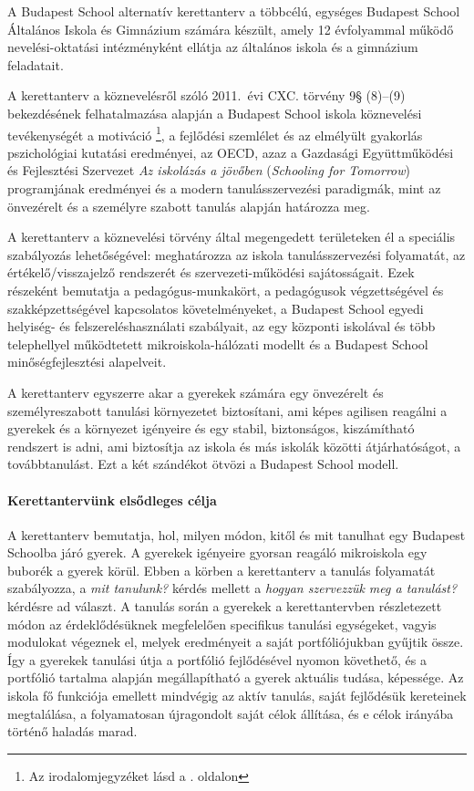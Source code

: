 A Budapest School alternatív kerettanterv a többcélú, egységes	Budapest School Általános Iskola és Gimnázium számára készült, amely 12 évfolyammal működő nevelési-oktatási intézményként ellátja az általános iskola és a gimnázium feladatait.

A kerettanterv a köznevelésről szóló 2011.~évi CXC. törvény 9§ (8)--(9) bekezdésének felhatalmazása alapján a Budapest School iskola köznevelési tevékenységét a motiváció \citep{pink2011drive}\footnote{Az irodalomjegyzéket lásd a \pageref{sec:bibliographyk}. oldalon}, a fejlődési szemlélet \citep{growthmindset} és az elmélyült gyakorlás \citep{ericsson2016peak} pszichológiai kutatási eredményei, az  OECD, azaz a Gazdasági Együttműködési és Fejlesztési Szervezet \emph{Az iskolázás a jövőben}  (\emph{Schooling for Tomorrow}) programjának eredményei \citep{2006schooling} és a modern tanulásszervezési paradigmák, mint az önvezérelt \citep{mitra2012beyond} és a személyre szabott \citep{khan2012one} tanulás alapján határozza meg.

A kerettanterv a köznevelési törvény által megengedett területeken él a speciális szabályozás lehetőségével: meghatározza az iskola tanulásszervezési folyamatát, az értékelő/visszajelző rendszerét és szervezeti-működési sajátosságait. Ezek részeként bemutatja a pedagógus-munkakört, a pedagógusok végzettségével és szakképzettségével kapcsolatos követelményeket, a Budapest School	egyedi helyiség- és felszereléshasználati szabályait, az egy központi iskolával és több telephellyel működtetett mikroiskola-hálózati modellt és a Budapest School minőségfejlesztési alapelveit.

A kerettanterv egyszerre akar a gyerekek számára egy önvezérelt és személyreszabott tanulási környezetet biztosítani, ami képes agilisen reagálni a gyerekek és a környezet igényeire és egy stabil, biztonságos, kiszámítható rendszert is adni, ami biztosítja az iskola és más iskolák közötti átjárhatóságot, a továbbtanulást. Ezt a két szándékot ötvözi a Budapest School modell.

\clearpage


\paragraph{Kerettantervünk elsődleges célja} A kerettanterv bemutatja,
hol, milyen\linebreak
módon, kitől és mit tanulhat egy Budapest Schoolba járó gyerek.
A gyerekek igényeire gyorsan reagáló mikroiskola egy buborék a gyerek körül. Ebben a körben a kerettanterv a tanulás folyamatát szabályozza, a \emph{mit tanulunk?} kérdés mellett a \emph{hogyan szervezzük meg a tanulást?} kérdésre ad választ. A tanulás során a gyerekek a kerettantervben részletezett módon az érdeklődésüknek megfelelően specifikus tanulási egységeket, vagyis modulokat végeznek el, melyek eredményeit a saját portfóliójukban gyűjtik össze. Így a gyerekek tanulási útja a portfólió fejlődésével nyomon követhető, és a portfólió tartalma alapján megállapítható a gyerek aktuális tudása, képessége. Az iskola fő funkciója emellett mindvégig az aktív tanulás, saját fejlődésük kereteinek megtalálása, a folyamatosan újragondolt saját célok állítása, és e célok irányába történő haladás marad.
 
